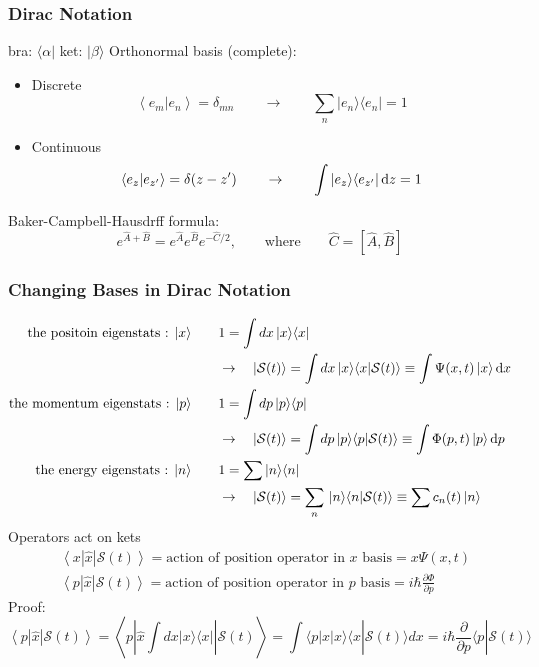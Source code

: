 \documentclass[a4paper,12pt]{article}
\begin{document}
\subsubsection{Dirac Notation}
bra: \(\langle \alpha|\) \newline
ket: \(|\beta\rangle\)  \newline
Orthonormal basis (complete):
\begin{itemize}
       \item Discrete \[
         \left\langle e_m|e_n \right\rangle =\delta_{mn} \qquad \rightarrow \qquad \sum_n |e_n\rangle\langle e_n|=1 
       \]
       \item Continuous \[
           \left\langle e_z|e_{z'} \right\rangle =\delta(z-z') \qquad\rightarrow\qquad\int  |e_z\rangle\langle e_{z'}|\,{\rm d}z=1 
       \]
\end{itemize}
Baker-Campbell-Hausdrff formula:
\[e^{\hat{A}+\hat{B}}=e^{\hat{A}}e^{\hat{B}}e^{-\hat{C}/2},\qquad\text{where}\qquad
\hat{C}=\left[\hat{A},\hat{B}\right] 
\]
\subsubsection{Changing Bases in Dirac Notation}
\[\begin{aligned}
        \text{the positoin eigenstats : } |x\rangle \qquad &1= \int dx\,|x\rangle\langle x| \\
        &\rightarrow\quad |\mathcal{S}(t)\rangle=\int dx\,|x\rangle\langle x|\mathcal{S}(t)\rangle\equiv\int\Psi(x,t)\,|x\rangle\,{\rm d}x \\
       \text{the momentum eigenstats : } |p\rangle \qquad &1= \int dp\,|p\rangle\langle p| \\
       &\rightarrow\quad |\mathcal{S}(t)\rangle=\int dp\,|p\rangle\langle p|\mathcal{S}(t)\rangle\equiv\int\Phi(p,t)\,|p\rangle\,{\rm d}p \\
       \text{the energy eigenstats : } |n\rangle \qquad &1= \sum |n\rangle\langle n| \\
       &\rightarrow\quad |\mathcal{S}(t)\rangle=\sum_n\,|n\rangle\langle n|\mathcal{S}(t)\rangle\equiv\sum c_n(t)\,|n\rangle\\
\end{aligned}\]
Operators act on kets\[\begin{aligned}
       &\left\langle x|\hat{x}|\mathcal{S}(t)\right\rangle  = \text{action of position operator in } x \text{ basis} = x\Psi(x,t) \\
       &\left\langle p|\hat{x}|\mathcal{S}(t)\right\rangle  = \text{action of position operator in } p \text{ basis} = i\hbar\frac{\partial \Phi}{\partial p}
\end{aligned}\]
Proof: \[
       \left\langle p|\hat{x}|\mathcal{S}(t)\right\rangle  
       = \left\langle p \left\lvert \hat{x}  \int dx |x\rangle\langle x| \right\rvert\mathcal{S}(t)\right\rangle 
       = \int \langle p|x|x\rangle \langle x|\mathcal{S}(t)\rangle dx = i\hbar\frac{\partial}{\partial p}\langle p|\mathcal{S}(t)\rangle
\]
\end{document}
